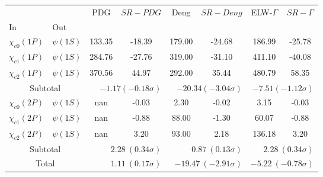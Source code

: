 \begin{tabular}{|l|l|c|c|c|c|c|c|}%
\hline%
&&PDG&$SR-PDG$&Deng&$SR-Deng$&ELW-$\Gamma$&$SR-\Gamma$\\%
In&Out&&&&&&\\%
\hline%
$\chi_{c0}(1P)$&$\psi(1S)$&133.35&-18.39&179.00&-24.68&186.99&-25.78\\%
$\chi_{c1}(1P)$&$\psi(1S)$&284.76&-27.76&319.00&-31.10&411.10&-40.08\\%
$\chi_{c2}(1P)$&$\psi(1S)$&370.56&44.97&292.00&35.44&480.79&58.35\\%
\hline%
\hline%
\multicolumn{2}{|c|}{Subtotal}&\multicolumn{2}{|r|}{$-1.17 (-0.18\sigma)$}&\multicolumn{2}{|r|}{$-20.34 (-3.04\sigma)$}&\multicolumn{2}{|r|}{$-7.51 (-1.12\sigma)$}\\%
\hline%
\hline%
$\chi_{c0}(2P)$&$\psi(1S)$&nan&-0.03&2.30&-0.02&3.15&-0.03\\%
$\chi_{c1}(2P)$&$\psi(1S)$&nan&-0.88&88.00&-1.30&60.07&-0.88\\%
$\chi_{c2}(2P)$&$\psi(1S)$&nan&3.20&93.00&2.18&136.18&3.20\\%
\hline%
\hline%
\multicolumn{2}{|c|}{Subtotal}&\multicolumn{2}{|r|}{$2.28~(0.34\sigma)$}&\multicolumn{2}{|r|}{$0.87~(0.13\sigma)$}&\multicolumn{2}{|r|}{$2.28~(0.34\sigma)$}\\%
\hline%
\hline%
\multicolumn{2}{|c|}{Total}&\multicolumn{2}{|r|}{$1.11~(0.17\sigma)$}&\multicolumn{2}{|r|}{$-19.47~(-2.91\sigma)$}&\multicolumn{2}{|r|}{$-5.22~(-0.78\sigma)$}\\%
\hline%
\end{tabular}